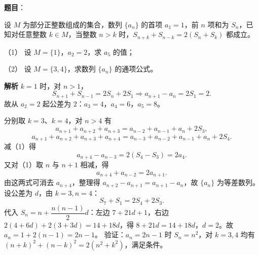 \begin{answer}

\textbf{题目}：

设 $M$ 为部分正整数组成的集合，数列 $\{a_n\}$ 的首项 $a_1=1$，前 $n$ 项和为 $S_n$，已知对任意整数 $k\in M$，当整数 $n>k$ 时，$S_{n+k}+S_{n-k}=2(S_n+S_k)$ 都成立。

（1） 设 $M=\{1\}$，$a_2=2$，求 $a_5$ 的值；

（2） 设 $M=\{3,4\}$，求数列 $\{a_n\}$ 的通项公式。

\textbf{解析}
$k=1$ 时，对 $n>1$，
\nopagebreak[4]
\[S_{n+1}+S_{n-1}=2S_n+2S_1\Longrightarrow a_{n+1}-a_n=2S_1=2.\]
故从 $a_2=2$ 起公差为 $2$：$a_3=4$，$a_4=6$，$a_5=8$。

分别取 $k=3$、$k=4$，对 $n>4$ 有
\nopagebreak[4]
\[a_{n+1}+a_{n+2}+a_{n+3}=a_{n-2}+a_{n-1}+a_n+2S_3,\tag{1}\]
\nopagebreak[4]
\[a_{n+1}+a_{n+2}+a_{n+3}+a_{n+4}=a_{n-3}+a_{n-2}+a_{n-1}+a_n+2S_4.\tag{2}\]
减（1）得
\nopagebreak[4]
\[a_{n+4}-a_{n-3}=2(S_4-S_3)=2a_4.\]
又对（1）取 $n$ 与 $n+1$ 相减，得
\nopagebreak[4]
\[a_{n+4}+a_{n-2}=2a_{n+1}.\]
由这两式可消去 $a_{n+4}$，整理得 $a_{n+2}-a_{n+1}=a_{n+1}-a_n$，故 $\{a_n\}$ 为等差数列。设公差为 $d$，由 $k=3,n=4$：
\nopagebreak[4]
\[S_7+S_1=2S_4+2S_3.\]
代入 $S_n=n+\dfrac{n(n-1)}2d$：左边 $7+21d+1$，右边 $2(4+6d)+2(3+3d)=14+18d$，得 $8+21d=14+18d$，$d=2$。故 $a_n=1+2(n-1)=2n-1$。
验证：$a_n=2n-1$ 时 $S_n=n^2$，对 $k=3,4$ 均有 $(n+k)^2+(n-k)^2=2(n^2+k^2)$，满足条件。



\end{answer}
